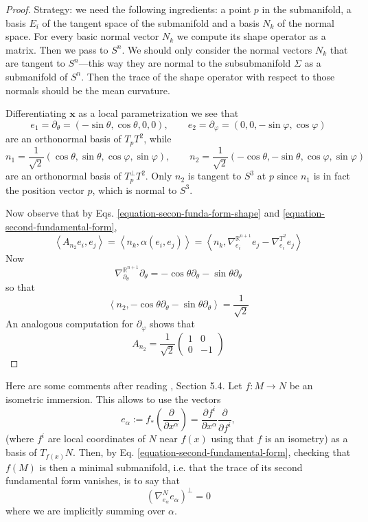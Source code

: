 \documentclass{book}
\begin{document}
\begin{proof}
Strategy: we need the following ingredients:
a point $p$ in the submanifold, a
basis $E_i$ of the tangent space of the
submanifold and a basis $N_k$ of the
normal space. For every basic normal vector
$N_k$ we compute its shape operator
as a matrix. Then we pass to $S^n$. We should
only consider the normal vectors
$N_k$ that are tangent to $S^n$---this way
they are normal to the subsubmanifold
$\Sigma$ as a submanifold of $S^n$. Then the
trace of the shape operator with
respect to those normals should be the mean
curvature.

Differentiating $\mathbf{x}$ as a local
parametrization we see that
$$
e_1=\partial_\theta=(-\sin\theta,\cos\theta,
0,0),\qquad
e_2=\partial_\varphi=(0,0,-\sin\varphi,
\cos\varphi)
$$
are an orthonormal basis of $T_pT^2$, while
$$
n_1=\frac{1}{\sqrt{2}}(\cos\theta,\sin\theta,
\cos\varphi,\sin\varphi),
\qquad
n_2=\frac{1}{\sqrt{2}}(-\cos\theta,-
\sin\theta,\cos\varphi,\sin\varphi)
$$
are an orthonormal basis of $T_p^\perp T^2$.
Only $n_2$ is tangent to $S^3$ at
$p$ since $n_1$ is in fact the position
vector $p$, which is normal to $S^3$.

Now observe that by Eqs.
\ref{equation-secon-funda-form-shape} and
\ref{equation-second-fundamental-form},
$$
\left\langle{}A_{n_2}e_i,e_j\right\rangle{}=\left\langle{}n_k,
\alpha(e_i,e_j)\right\rangle{}
=\left\langle{}n_k,\nabla^{\mathbb{R}^{n+1}}_{e_i}e_j
-\nabla^{T^2}_{e_i}e_j\right\rangle{}
$$
Now
$$
\nabla^{\mathbb{R}^{n+1}}_{\partial_\theta}
\partial_\theta=
-\cos\theta\partial_\theta-
\sin\theta\partial_\theta
$$
so that
$$
\left\langle{}n_2,-\cos\theta\partial_\theta-
\sin\theta\partial_\theta\right\rangle{}
=\frac{1}{\sqrt{2}}
$$
An analogous computation for
$\partial_\varphi$ shows that
$$
A_{n_2}=\frac{1}{\sqrt{2}}\begin{pmatrix}
1&0\\
0&-1
\end{pmatrix}
$$
\end{proof}

Here are some comments after reading
\cite{Jost}, Section 5.4. Let $f:M\to N$ be
an isometric immersion. This allows to use
the vectors
$$
e_\alpha:=f_*\left(\frac{\partial }{\partial
x^\alpha}\right)=
\frac{\partial f^i}{\partial
x^\alpha}\frac{\partial }{\partial f^i},
$$
(where $f^i$ are local coordinates of $N$
near $f(x)$ using that $f$ is an
isometry) as a basis of
$T_{f(x)}N$. Then, by Eq.
\ref{equation-second-fundamental-form},
checking that
$f(M)$ is then a minimal submanifold, i.e.
that the trace of its second
fundamental form vanishes, is to say that
\begin{equation}
\label{equation-isometric-immersion-basis}
(\nabla^{N}_{e_\alpha}e_\alpha)^\perp=0
\end{equation}
where we are implicitly summing over
$\alpha$.
\end{document}
